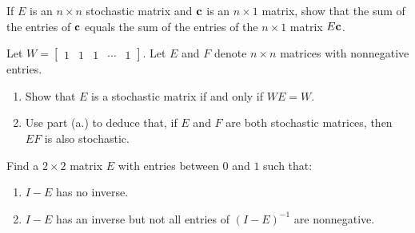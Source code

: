\documentclass{ximera}
\begin{document}
\begin{problem}\label{prob:i/o_7}
If $E$ is an $n \times n$ stochastic matrix and ${\bf c}$ is an $n \times 1$ matrix, show that the sum of the entries of ${\bf c}$ equals the sum of the entries of the $n \times 1$ matrix $E{\bf c}$.
\end{problem}

\begin{problem}\label{prob:i/o_8}
Let $W = \begin{bmatrix}
1 & 1 & 1 & \cdots & 1
\end{bmatrix}$. Let $E$ and $F$ denote $n \times n$ matrices with nonnegative entries.

\begin{enumerate}
    \item Show that $E$ is a stochastic matrix if and only if $WE = W$.
    \item Use part (a.) to deduce that, if $E$ and $F$ are both stochastic matrices, then $EF$ is also stochastic.
\end{enumerate}
\end{problem} 

\begin{problem}\label{prob:2x2examples}
Find a $2 \times 2$ matrix $E$ with entries between $0$ and $1$ such that:

\begin{enumerate}
\item\label{prob:i/o_11} $I - E$ has no inverse.

\item\label{prob:i/o_12} $I - E$ has an inverse but not all entries of $(I - E)^{-1}$ are nonnegative.

\end{enumerate}

\end{problem}
\end{document}

